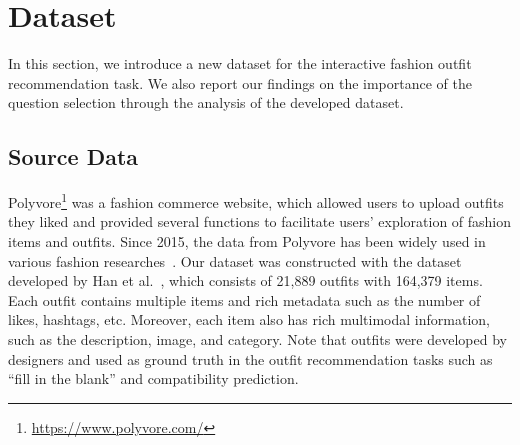 \chapter{Dataset}
\label{sq:dataset}

In this section, we introduce a new dataset for the interactive fashion outfit recommendation task. We also report our findings on the importance of the question selection through the analysis of the developed dataset.

\section{Source Data}
Polyvore\footnote{\url{https://www.polyvore.com/}} was a fashion commerce website, 
which allowed users to upload outfits they liked
and provided several functions to facilitate users' exploration of fashion items and outfits. 
Since 2015, the data from Polyvore has been widely used in various fashion researches~\cite{hu2015collaborative, li2017mining, vaccaro2016elements, chen2019pog}.
Our dataset was constructed with the dataset developed by Han et al.~\cite{han2017learning}, 
which consists of 21,889 outfits with 164,379 items.
Each outfit contains multiple items and rich metadata such as  the number of likes, hashtags, etc. 
Moreover, each item also has rich multimodal information, such as the description, image, and category. 
Note that outfits were developed by designers and used as 
ground truth in the outfit recommendation tasks
such as ``fill in the blank'' and compatibility prediction. 


